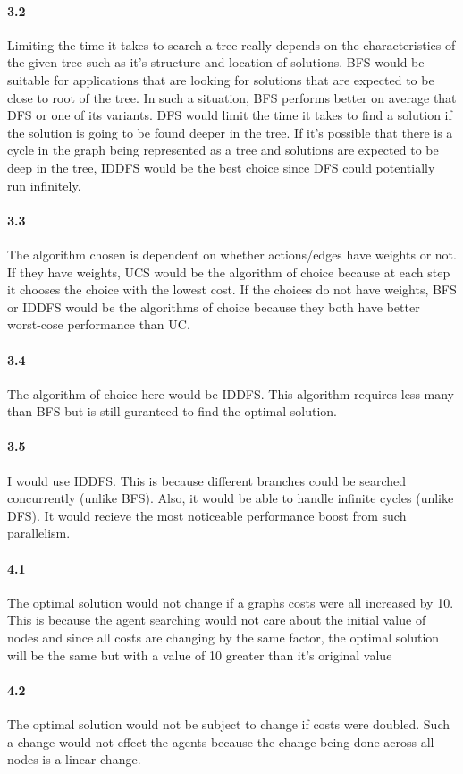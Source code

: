 \documentclass[12pt]{article}
\begin{document}
\paragraph{3.2}
Limiting the time it takes to search a tree really depends on the characteristics of the given tree such as it's structure and location of solutions. BFS would be suitable for applications that are looking for solutions that are expected to be close to root of the tree. In such a situation, BFS performs better on average that DFS or one of its variants. DFS would limit the time it takes to find a solution if the solution is going to be found deeper in the tree. If it's possible that there is a cycle in the graph being represented as a tree and solutions are expected to be deep in the tree, IDDFS would be the best choice since DFS could potentially run infinitely.
\paragraph{3.3}
The algorithm chosen is dependent on whether actions/edges have weights or not. If they have weights, UCS would be the algorithm of choice because at each step it chooses the choice with the lowest cost. If the choices do not have weights, BFS or IDDFS would be the algorithms of choice because they both have better worst-cose performance than UC.
\paragraph{3.4}
The algorithm of choice here would be IDDFS. This algorithm requires less many than BFS but is still guranteed to find the optimal solution.
\paragraph{3.5}
I would use IDDFS. This is because different branches could be searched concurrently (unlike BFS). Also, it would be able to handle infinite cycles (unlike DFS). It would recieve the most noticeable performance boost from such parallelism.
\paragraph{4.1}
The optimal solution would not change if a graphs costs were all increased by 10. This is because the agent searching would not care about the initial value of nodes and since all costs are changing by the same factor, the optimal solution will be the same but with a value of 10 greater than it's original value
\paragraph{4.2}
The optimal solution would not be subject to change if costs were doubled. Such a change would not effect the agents because the change being done across all nodes is a linear change.
\end{document}

